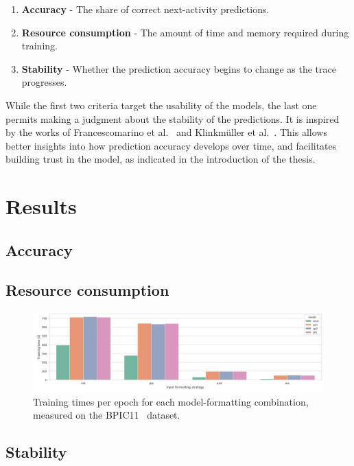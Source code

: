 \begin{enumerate}
    \item\textbf{Accuracy} - The share of correct next-activity predictions.
    \item\textbf{Resource consumption} - The amount of time and memory required during training.
    \item\textbf{Stability} - Whether the prediction accuracy begins to change as the trace progresses.
\end{enumerate}

While the first two criteria target the usability of the models, the last one permits making a judgment about the stability of the predictions. It is inspired by the works of Francescomarino et al.~\cite{francescomarino2015} and Klinkmüller et al.~\cite{klinkmuller2018reliablemonitoring}. This allows better insights into how prediction accuracy develops over time, and facilitates building trust in the model, as indicated in the introduction of the thesis.

\section{Results}\label{sec:eval:results}


\subsection*{Accuracy}

\subsection*{Resource consumption}
\begin{figure}
    \centering
    \includegraphics[width=\textwidth]{gfx/bpic11-training-timings.jpg}
    \caption{Training times per epoch for each model-formatting combination, measured on the BPIC11~\cite{BPIC11} dataset.}
    \label{fig:timings_BPIC11}
\end{figure}

\subsection*{Stability}

